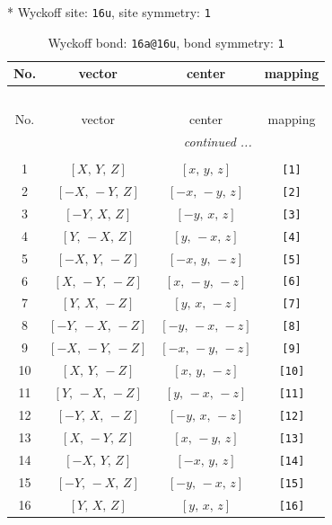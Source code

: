\documentclass[fleqn,8pt]{jsarticle}
\begin{document}
* Wyckoff site: {\tt 16u}, site symmetry: {\tt 1}
\renewcommand{\arraystretch}{1.2}
\begin{longtable}{cccc}
\caption{Wyckoff bond: {\tt 16a@16u}, bond symmetry: {\tt 1}}
 \\
 \hline \hline
No. & vector & center & mapping \\ \hline \endfirsthead

\multicolumn{3}{l}{\tablename\ \thetable{}} \\
 \hline \hline
No. & vector & center & mapping \\ \hline \endhead

 \hline \hline
\multicolumn{3}{r}{\footnotesize\it continued ...} \\ \endfoot

 \hline \hline
\multicolumn{3}{r}{} \\ \endlastfoot

1 & $\left[ X,\, Y,\, Z \right]$ & $\left[ x,\, y,\, z \right]$ & {\tt [1]} \\ \hline
2 & $\left[ - X,\, - Y,\, Z \right]$ & $\left[ - x,\, - y,\, z \right]$ & {\tt [2]} \\ \hline
3 & $\left[ - Y,\, X,\, Z \right]$ & $\left[ - y,\, x,\, z \right]$ & {\tt [3]} \\ \hline
4 & $\left[ Y,\, - X,\, Z \right]$ & $\left[ y,\, - x,\, z \right]$ & {\tt [4]} \\ \hline
5 & $\left[ - X,\, Y,\, - Z \right]$ & $\left[ - x,\, y,\, - z \right]$ & {\tt [5]} \\ \hline
6 & $\left[ X,\, - Y,\, - Z \right]$ & $\left[ x,\, - y,\, - z \right]$ & {\tt [6]} \\ \hline
7 & $\left[ Y,\, X,\, - Z \right]$ & $\left[ y,\, x,\, - z \right]$ & {\tt [7]} \\ \hline
8 & $\left[ - Y,\, - X,\, - Z \right]$ & $\left[ - y,\, - x,\, - z \right]$ & {\tt [8]} \\ \hline
9 & $\left[ - X,\, - Y,\, - Z \right]$ & $\left[ - x,\, - y,\, - z \right]$ & {\tt [9]} \\ \hline
10 & $\left[ X,\, Y,\, - Z \right]$ & $\left[ x,\, y,\, - z \right]$ & {\tt [10]} \\ \hline
11 & $\left[ Y,\, - X,\, - Z \right]$ & $\left[ y,\, - x,\, - z \right]$ & {\tt [11]} \\ \hline
12 & $\left[ - Y,\, X,\, - Z \right]$ & $\left[ - y,\, x,\, - z \right]$ & {\tt [12]} \\ \hline
13 & $\left[ X,\, - Y,\, Z \right]$ & $\left[ x,\, - y,\, z \right]$ & {\tt [13]} \\ \hline
14 & $\left[ - X,\, Y,\, Z \right]$ & $\left[ - x,\, y,\, z \right]$ & {\tt [14]} \\ \hline
15 & $\left[ - Y,\, - X,\, Z \right]$ & $\left[ - y,\, - x,\, z \right]$ & {\tt [15]} \\ \hline
16 & $\left[ Y,\, X,\, Z \right]$ & $\left[ y,\, x,\, z \right]$ & {\tt [16]} \\
\end{longtable}
\end{document}
